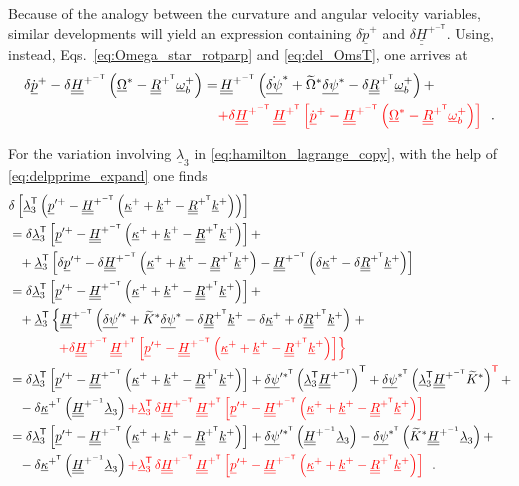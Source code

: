 \documentclass[12pt,a4paper,oneside,english]{abntex2} %
\newcommand{\fix}[1]{{\color{red}#1}}
\newcommand{\vect}[1]{\underline{#1}}
\def\tens#1{\underline{\underline{#1}}}
\def\til#1{\widetilde{#1}}
\def\lb{\left[}
\def\rb{\right]}
\def\lp{\left(}
\def\rp{\right)}
\def\T{\mathsf{T}}
\def\R{\tens{R}}
\def\RpT{\R^{+^\T}}
\def\om{\vect{\omega}_b}
\def\omp{\om^{+}}
\def\kap{\vect{\kappa}}
\def\kapp{\kap^{+}}
\def\kappT{\kap^{+^\T}}
\def\k{\vect{k}}
\def\kp{\k^{+}}
\def\Ktil{\til{K}}
\def\Ktils{\Ktil^{*}}
\def\Om{\vect{\Omega}}
\def\Oms{\Om^{*}}
\def\Omtil{\til{\Omega}}
\def\Omtils{\Omtil^{*}}
\def\H{\tens{H}}
\def\HpT{\H^{+^\T}}
\def\Hpinv{\H^{+^{-1}}}
\def\HpmT{\H^{+^{-\T}}}
\def\p{\vect{p}}
\def\pdot{\dot{\p}}
\def\ppdot{\pdot^{+}}
\def\ppprime{\p^{\prime{+}}}
\def\delpsi{\vect{\delta\psi}}
\def\delpsis{\delpsi^*}
\def\delpsisT{\delpsi^{*^\T}}
\def\delpsips{\delpsi^{\prime*}}
\def\delpsipsT{\delpsi^{\prime*^\T}}
\def\delpsidot{\dot{\delpsi}}
\def\delpsisdot{\delpsidot^{*}}
\def\lamb{\vect{\lambda}}
\begin{document}
\begin{apendicesenv}
Because of the analogy between the curvature and angular velocity variables, similar developments will yield an expression containing $\delta\ppdot$ and $\delta\HpmT$. Using, instead, Eqs.~\eqref{eq:Omega_star_rotparp} and \eqref{eq:del_OmsT}, one arrives at
\begin{align}
    \delta\ppdot -\delta\HpmT\lp\Oms-\RpT\omp\rp = & \, \HpmT\lp\delpsisdot + \Omtils\delpsis - \delta\RpT\omp\rp + \nonumber \\
    & \fix{+ \delta\HpmT\,\HpT\lb\ppdot-\HpmT\lp\Oms-\RpT\omp\rp\rb} \ \ .
    \label{eq:delpdot_expand}
\end{align}

For the variation involving $\lamb_3$ in \cref{eq:hamilton_lagrange_copy}, with the help of \cref{eq:delpprime_expand} one finds
\begin{align}
    &\delta\lb\lamb_3^\T\lp\ppprime-\HpmT\lp\kapp+\kp-\RpT\kp\rp\rp\rb \nonumber
    \\
    &=\delta\lamb_3^\T\lb\ppprime-\HpmT\lp\kapp+\kp-\RpT\kp\rp\rb + \nonumber \\& \hphantom{=} + \lamb_3^\T \lb \delta\ppprime - \delta\HpmT \lp \kapp + \kp - \RpT\kp \rp - \HpmT \lp \delta\kapp - \delta\RpT\kp \rp \rb \nonumber
    \\
    &=\delta\lamb_3^\T\lb\ppprime-\HpmT\lp\kapp+\kp-\RpT\kp\rp\rb + \nonumber \\ & \hphantom{=} + \lamb_3^\T \left\{ \HpmT \lp \delpsips + \Ktils\delpsis - \delta\RpT\kp - \delta\kapp + \delta\RpT\kp \rp \right. + \nonumber \\
     & \hphantom{= + \lamb_3^\T \left\{\right.} \fix{\left. + \delta\HpmT\,\HpT\lb\ppprime-\HpmT\lp\kapp+\kp-\RpT\kp\rp\rb \right\}} \nonumber
    \\
    &=\delta\lamb_3^\T\lb\ppprime-\HpmT\lp\kapp+\kp-\RpT\kp\rp\rb + \delpsipsT\lp\lamb_3^\T\HpmT\rp^\T + \delpsisT\lp\lamb_3^\T\HpmT\Ktils\rp^{\fix{\T}} + \nonumber \\ & \hphantom{=} - \delta\kappT\lp\Hpinv\lamb_3\rp \fix{+ \lamb_3^\T\,\delta\HpmT\,\HpT\lb\ppprime-\HpmT\lp\kapp+\kp-\RpT\kp\rp\rb} \nonumber
    \\
    &=\delta\lamb_3^\T\lb\ppprime-\HpmT\lp\kapp+\kp-\RpT\kp\rp\rb +
    \delpsipsT\lp\Hpinv\lamb_3\rp - \delpsisT\lp\Ktils\Hpinv\lamb_3\rp + \nonumber \\ & \hphantom{=} - \delta\kappT\lp\Hpinv\lamb_3\rp \fix{+ \lamb_3^\T\,\delta\HpmT\,\HpT\lb\ppprime-\HpmT\lp\kapp+\kp-\RpT\kp\rp\rb} \ \ .
    \label{eq:dellambda3_exp}
\end{align}


\end{apendicesenv}
\end{document}
